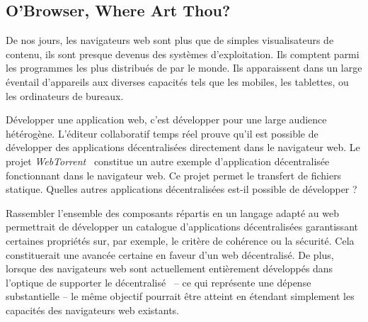 

\subsection{O'Browser, Where Art Thou?}

De nos jours, les navigateurs web sont plus que de simples visualisateurs de
contenu, ils sont presque devenus des systèmes d'exploitation. Ils comptent
parmi les programmes les plus distribués de par le monde. Ils apparaissent dans
un large éventail d'appareils aux diverses capacités tels que les mobiles, les
tablettes, ou les ordinateurs de bureaux.

Développer une application web, c'est développer pour une large audience
hétérogène.  L'éditeur collaboratif temps réel \CRATE prouve qu'il est possible
de développer des applications décentralisées directement dans le navigateur
web. Le projet \emph{WebTorrent}~\cite{webtorrent} constitue un autre exemple
d'application décentralisée fonctionnant dans le navigateur web. Ce projet permet
le transfert de fichiers statique. Quelles autres applications décentralisées
est-il possible de développer ?

Rassembler l'ensemble des composants répartis en un langage adapté au web
permettrait de développer un catalogue d'applications décentralisées
garantissant certaines propriétés sur, par exemple, le critère de cohérence ou
la sécurité. Cela constituerait une avancée certaine en faveur d'un web
décentralisé. De plus, lorsque des navigateurs web sont actuellement entièrement
développés dans l'optique de supporter le décentralisé~\cite{maelstrom} -- ce
qui représente une dépense substantielle -- le même objectif pourrait être
atteint en étendant simplement les capacités des navigateurs web existants.


